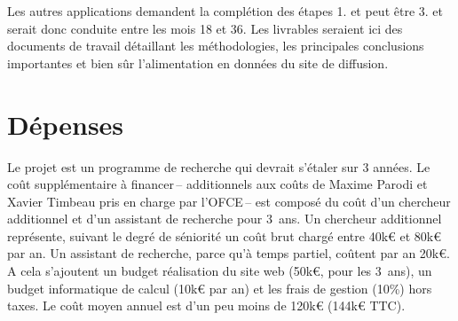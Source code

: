 \documentclass[
  french,
  9pt,
  a4paper,
  DIV=11,
  twoside=semi]{scrreprt}
\begin{document}
Les autres applications demandent la complétion des étapes 1. et peut
être 3. et serait donc conduite entre les mois 18 et 36. Les livrables
seraient ici des documents de travail détaillant les méthodologies, les
principales conclusions importantes et bien sûr l'alimentation en
données du site de diffusion.

\chapter{Dépenses}\label{duxe9penses}

Le projet est un programme de recherche qui devrait s'étaler sur 3
années. Le coût supplémentaire à financer\,-- additionnels aux coûts de
Maxime Parodi et Xavier Timbeau pris en charge par l'OFCE\,-- est
composé du coût d'un chercheur additionnel et d'un assistant de
recherche pour 3~ans. Un chercheur additionnel représente, suivant le
degré de séniorité un coût brut chargé entre 40k€ et 80k€ par an. Un
assistant de recherche, parce qu'à temps partiel, coûtent par an 20k€. A
cela s'ajoutent un budget réalisation du site web (50k€, pour les
3~ans), un budget informatique de calcul (10k€ par an) et les frais de
gestion (10\%) hors taxes. Le coût moyen annuel est d'un peu moins de
120k€ (144k€ TTC).
\end{document}
